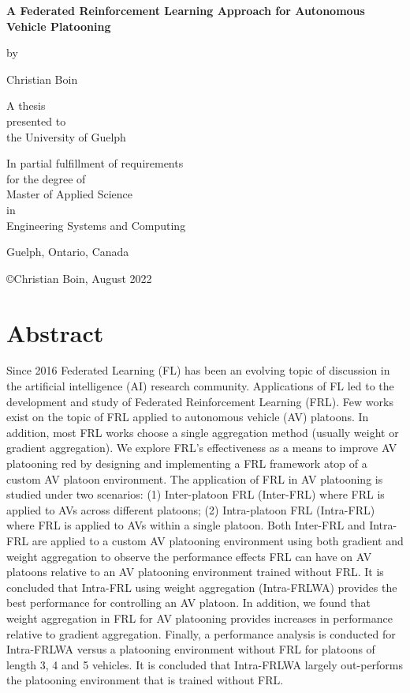 \documentclass[oneside, 12pt]{book}
\begin{document}
\begin{titlepage}
	\setlength{\parskip}{12pt}
	\centering
	{\textbf{\LARGE A Federated Reinforcement Learning Approach for Autonomous Vehicle Platooning}\par}
	\vspace{1.5 cm}
	{by}\par
	\vspace{1 cm}
	{Christian Boin}\par
	\vspace{2cm}
	{A thesis\\
	presented to\\
	the University of Guelph}\par
	\vspace{2cm}
	{In partial fulfillment of requirements\\
	for the degree of\\
	Master of Applied Science\\
	in\\
	Engineering Systems and Computing}\par
	\vspace{2cm}
	{\normalsize Guelph, Ontario, Canada}\par
	\vspace{0.25cm}
	{\copyright\hspace{6pt}Christian Boin, August 2022}\par
\end{titlepage}

\chapter*{Abstract}
Since 2016 Federated Learning (FL) has been an evolving topic of discussion in the artificial 
intelligence (AI) research community.  Applications of FL led to the development and study of 
Federated Reinforcement Learning (FRL).  Few works exist on the topic of FRL applied to 
autonomous vehicle (AV) platoons. In addition, most FRL works choose a single aggregation 
method (usually weight or gradient aggregation). We explore FRL's effectiveness as a means 
to improve AV platooning red by designing and implementing a FRL framework atop of a custom 
AV platoon environment.  The application of FRL in AV platooning is studied under two 
scenarios: (1)  Inter-platoon FRL (Inter-FRL) where FRL is applied to AVs across different 
platoons; (2) Intra-platoon FRL (Intra-FRL) where FRL is applied to AVs within a single 
platoon. Both Inter-FRL and Intra-FRL are applied to a custom AV platooning environment using
both gradient and weight aggregation to observe the performance effects FRL can have on AV 
platoons relative to an AV platooning environment trained without FRL.  It is concluded that 
Intra-FRL using weight aggregation (Intra-FRLWA) provides the best performance for 
controlling an AV platoon. In addition, we found that weight aggregation in FRL for 
AV platooning provides increases in performance relative to gradient aggregation. 
Finally, a performance analysis is conducted for Intra-FRLWA versus a platooning 
environment without FRL for platoons of length 3, 4 and 5 vehicles. It is concluded 
that Intra-FRLWA largely out-performs the platooning environment that is trained without FRL.
\end{document}
